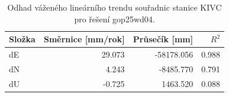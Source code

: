 \begin{table}[H]
\centering
\small
\caption{Odhad váženého lineárního trendu souřadnic stanice KIVC pro řešení gop25wd04.}
\label{tab:gop25wd04_stcd_kivc_trend_weighted_1seg}
\begin{tabular}{lrrr}
\toprule
Složka & Směrnice [mm/rok] & Průsečík [mm] & $R^2$ \\
\midrule
dE & 29.073 & -58178.056 & 0.988 \\
dN & 4.243 & -8485.770 & 0.791 \\
dU & -0.725 & 1463.520 & 0.088 \\
\bottomrule
\end{tabular}
\end{table}
